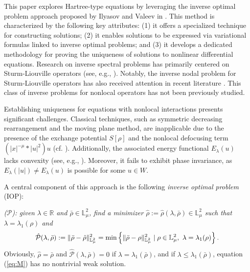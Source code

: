 \documentclass[12pt,thmsa]{article}
\begin{document}
This paper explores Hartree-type equations by leveraging the inverse optimal
problem approach proposed by Ilyasov and Valeev in \cite{ValIl_JDE,
ValIl_PhysD, ValIl2025, ValeevIl2018}. This method is characterized by the
following key attributes: (1) it offers a specialized technique for
constructing solutions; (2) it enables solutions to be expressed via
variational formulas linked to inverse optimal problems; and (3) it develops
a dedicated methodology for proving the uniqueness of solutions to nonlinear
differential equations. Research on inverse spectral problems has primarily
centered on Sturm-Liouville operators (see, e.g., \cite{ValIl2025, Qi, Wei,
ZhangM}). Notably, the inverse nodal problem for Sturm-Liouville operators
has also received attention in recent literature \cite{CMX,HWXZ}. This class
of inverse problems for nonlocal operators has not been previously studied.

Establishing uniqueness for equations with nonlocal interactions presents
significant challenges. Classical techniques, such as symmetric decreasing
rearrangement and the moving plane method, are inapplicable due to the
presence of the exchange potential $S[\rho ]$ and the nonlocal defocusing
term $\left( |x|^{-\mu }\ast |u|^{2}\right) u$ (cf. \cite{Brascamp, Kwong,
Lieb}). Additionally, the associated energy functional $E_{\lambda }(u)$
lacks convexity (see, e.g., \cite{ChoquardSt}). Moreover, it fails to
exhibit phase invariance, as $E_{\lambda }(|u|)\neq E_{\lambda }(u)$ is
possible for some $u\in W$.

A central component of this approach is the following \textit{inverse
optimal problem} (IOP):

\medskip \noindent \textit{($\mathcal{P}$): given $\lambda \in \mathbb{R}$
and $\bar{\rho}\in \mathbb{L}_{\mu }^{2}$, find a minimizer $\hat{\rho}:=%
\hat{\rho}(\lambda ,\bar{\rho})\in \mathbb{L}_{\mu }^{2}$ such that $\lambda
=\lambda _{1}(\rho )$ and}
\begin{equation}
\hat{\mathcal{P}}(\lambda ,\bar{\rho}):=\Vert \bar{\rho}-\hat{\rho}\Vert _{%
\mathbb{L}_{\mu }^{2}}^{2}=\min \left\{ \Vert \bar{\rho}-\rho \Vert _{%
\mathbb{L}_{\mu }^{2}}^{2}\mid \rho \in \mathbb{L}_{\mu }^{2},\ \lambda
=\lambda _{1}(\rho )\right\} .  \label{eq:p}
\end{equation}%
Obviously, $\hat{\rho}=\bar{\rho}$ and $\hat{\mathcal{P}}(\lambda ,\bar{\rho}%
)=0$ if $\lambda =\lambda _{1}(\bar{\rho})$, and if $\lambda \leq \lambda
_{1}(\bar{\rho})$, equation (\ref{eq:M}) has no nontrivial weak solution.
\end{document}
